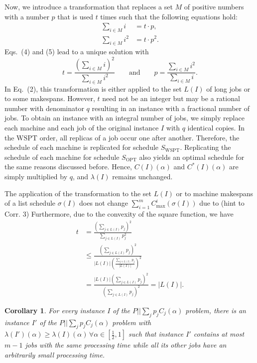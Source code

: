 \documentclass[11pt]{article}
\newtheorem{corollary}{Corollary}
\newcommand{\WSPT}{\mathrm{WSPT}}
\newcommand{\OPT}{\mathrm{OPT}}
\begin{document}
Now, we introduce a transformation that replaces a set $M$ of positive
numbers with a number $p$ that is used $t$ times such that the following
equations hold:
\begin{align}
        \sum_{i\in M} i &= t\cdot p, \\
        \sum_{i\in M} i^2 &= t\cdot p^2 .
\end{align}
Eqs.~(4) and (5) lead to a unique solution with
\[
        t=\frac{\left(\sum_{i\in M}i\right)^2}{\sum_{i\in M}i^2}
        \qquad\text{and}\qquad
        p=\frac{\sum_{i\in M}i^2}{\sum_{i\in M}i}.
\]
In Eq.~(2), this transformation is either applied to the set $L(I)$ of long
jobs or to some makespans. However, $t$ need not be an integer but may be a
rational number with denominator $q$ resulting in an instance with a
fractional number of jobs. To obtain an instance with an integral number of
jobs, we simply replace each machine and each job of the original instance
$I$ with $q$ identical copies. In the \(\mathrm{WSPT}\) order, all replicas of a job occur
one after another. Therefore, the schedule of each machine is replicated for
schedule $S_{\WSPT}$. Replicating the schedule of each machine for schedule
$S_{\OPT}$ also yields an optimal schedule for the same reasons discussed
before. Hence, $C(I)(\alpha)$ and $C^*(I)(\alpha)$ are simply multiplied by $q$, and
$\lambda(I)$ remains unchanged.

The application of the transformation to the set $L(I)$ or to machine
makespans of a list schedule $\sigma(I)$ does not change
$\sum_{i=1}^m C_{\max}^i(\sigma(I))$ due to (hint to Corr. 3) Furthermore, due to the
convexity of the square function, we have
\begin{equation}
\begin{aligned}
        t
        &=
        \frac{\left(\sum_{j\in L(I)}p_j\right)^2}
        {\sum_{j\in L(I)}p_j^2}                                      \\
        &\leq
        \frac{\left(\sum_{j\in L(I)}p_j\right)^2}
        {|L(I)|\left(\frac{\sum_{j\in L(I)}p_j}{|L(I)|}\right)^2}       \\
        &=
        \frac{|L(I)|\left(\sum_{j\in L(I)}p_j\right)^2}
        {\left(\sum_{j\in L(I)}p_j\right)^2}
        =
        |L(I)|.
\end{aligned}
\end{equation}


\begin{corollary}
For every instance $I$ of the $P||\sum_j p_j C_j(\alpha)$ problem, there is an
instance $I'$ of the $P||\sum_j p_j C_j(\alpha)$ problem with
$\lambda(I')(\alpha)\geq\lambda(I)(\alpha) \, \forall \alpha \in [\frac12,1]$ such that instance $I'$ contains at most $m-1$
jobs with the same processing time while all its other jobs have an
arbitrarily small processing time.
\end{corollary}
\end{document}
